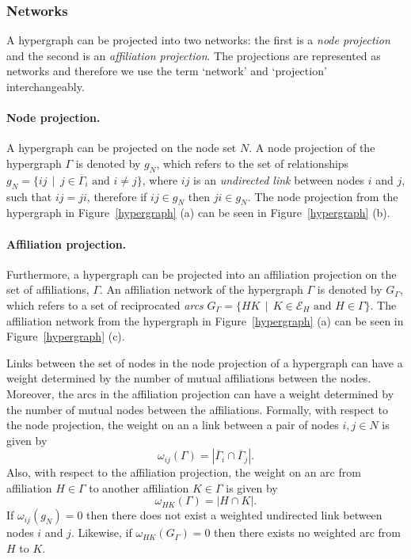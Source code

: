 \subsubsection*{Networks}

A hypergraph can be projected into two networks: the first is a \emph{node projection} and the second is an \emph{affiliation projection}. The projections are represented as networks and therefore we use the term `network' and `projection' interchangeably.

\paragraph{Node projection.}

A hypergraph can be projected on the node set $N$. A node projection of the hypergraph $\Gamma$ is denoted by $g_N$, which refers to the set of relationships $g_N = \{ij \, \mid \, j \in \overline{\Gamma}_{i} \mbox{ and } i \neq j \}$, where $ij$ is an \emph{undirected link} between nodes $i$ and $j$, such that $ij = ji$, therefore if $ij \in g_{N}$ then $ji \in g_{N}$. The node projection from the hypergraph in Figure~\ref{hypergraph} (a) can be seen in Figure~\ref{hypergraph} (b).

\paragraph{Affiliation projection.}

Furthermore, a hypergraph can be projected into an affiliation projection on the set of affiliations, $\Gamma$. An affiliation network of the hypergraph $\Gamma$ is denoted by $G_{\Gamma}$, which refers to a set of reciprocated \emph{arcs} $G_{\Gamma} = \{ HK \, \mid \, K \in \mathcal{E}_{H} \mbox{ and } H \in \Gamma \}$. The affiliation network from the hypergraph in Figure~\ref{hypergraph} (a) can be seen in Figure~\ref{hypergraph} (c).

Links between the set of nodes in the node projection of a hypergraph can have a weight determined by the number of mutual affiliations between the nodes. Moreover, the arcs in the affiliation projection can have a weight determined by the number of mutual nodes between the affiliations. Formally, with respect to the node projection, the weight on an a link between a pair of nodes $i,j \in N$ is given by
\begin{equation} \label{eq:nodeweight}
\omega_{ij}(\Gamma) = | \overline{\Gamma}_{i} \cap \overline{\Gamma}_{j} | .
\end{equation}
Also, with respect to the affiliation projection, the weight on an arc from affiliation $H \in \Gamma$ to another affiliation $K \in \Gamma$ is given by
\begin{equation} \label{eq:affweight}
\omega_{HK}(\Gamma) = | H \cap K | .
\end{equation}
If $\omega_{ij}(g_{N}) = 0$ then there does not exist a weighted undirected link between nodes $i$ and $j$. Likewise, if $\omega_{HK}(G_{\Gamma}) = 0$ then there exists no weighted arc from $H$ to $K$.

